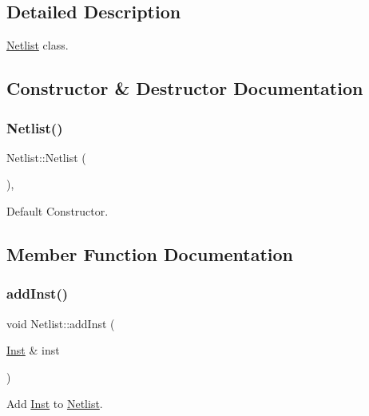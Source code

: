 \subsection{Detailed Description}
\hyperlink{classNetlist}{Netlist} class. 

\subsection{Constructor \& Destructor Documentation}
\mbox{\label{classNetlist_a946b08b1adb8999f1cff352f5e9b588b}} 
\subsubsection{\texorpdfstring{Netlist()}{Netlist()}}
{\footnotesize\ttfamily Netlist\+::\+Netlist (\begin{DoxyParamCaption}{ }\end{DoxyParamCaption})\hspace{0.3cm}{\ttfamily [explicit]}, {\ttfamily [default]}}



Default Constructor. 



\subsection{Member Function Documentation}
\mbox{\label{classNetlist_a9214addbaff42dc7041509529d0ccb3c}} 
\subsubsection{\texorpdfstring{add\+Inst()}{addInst()}}
{\footnotesize\ttfamily void Netlist\+::add\+Inst (\begin{DoxyParamCaption}\item[{\hyperlink{classInst}{Inst} \&}]{inst }\end{DoxyParamCaption})\hspace{0.3cm}{\ttfamily [inline]}}



Add \hyperlink{classInst}{Inst} to \hyperlink{classNetlist}{Netlist}. 

\mbox{\label{classNetlist_ab26277ae8a5f0ef605709c27e63c5492}} 
